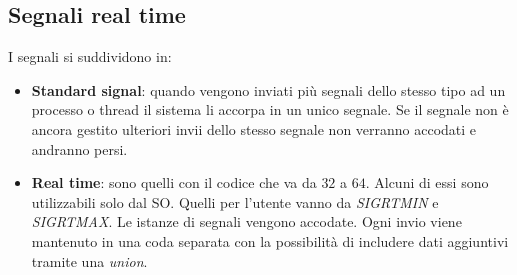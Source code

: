 \subsection{Segnali real time}
I segnali si suddividono in:
\begin{itemize}
	\item \textbf{Standard signal}: quando vengono inviati più segnali dello stesso tipo ad un processo o thread il sistema li accorpa in un unico segnale. Se il segnale non è ancora gestito ulteriori invii dello stesso segnale non verranno accodati e andranno persi.
	\item \textbf{Real time}: sono quelli con il codice che va da $32$ a $64$. Alcuni di essi sono utilizzabili solo dal SO. Quelli per l'utente vanno da \textit{SIGRTMIN} e \textit{SIGRTMAX}. Le istanze di segnali vengono accodate. Ogni invio viene mantenuto in una coda separata con la possibilità di includere dati aggiuntivi tramite una \textit{union}.
\end{itemize}

